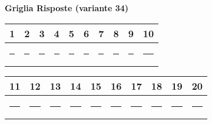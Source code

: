 \documentclass{exam}%
\newcounter{variant}%
\begin{document}
%
\normalsize%
\setcounter{variant}{34}%
\noindent \textbf{  }%
\bigskip%
\noindent\textbf{Griglia Risposte (variante 34)}%
\begin{center}
\begin{tabular}{|c|c|c|c|c|c|c|c|c|c|}
\hline
1 & 2 & 3 & 4 & 5 & 6 & 7 & 8 & 9 & 10 \\ \hline
\rule{1cm}{0pt}\rule[-0.5em]{0pt}{1.5em} & \rule{1cm}{0pt}\rule[-0.5em]{0pt}{1.5em} & \rule{1cm}{0pt}\rule[-0.5em]{0pt}{1.5em} & \rule{1cm}{0pt}\rule[-0.5em]{0pt}{1.5em} & \rule{1cm}{0pt}\rule[-0.5em]{0pt}{1.5em} & \rule{1cm}{0pt}\rule[-0.5em]{0pt}{1.5em} & \rule{1cm}{0pt}\rule[-0.5em]{0pt}{1.5em} & \rule{1cm}{0pt}\rule[-0.5em]{0pt}{1.5em} & \rule{1cm}{0pt}\rule[-0.5em]{0pt}{1.5em} & \rule{1cm}{0pt}\rule[-0.5em]{0pt}{1.5em} \\ \hline
\end{tabular}
\end{center}%
\vspace{0.3em}%
\begin{center}
\begin{tabular}{|c|c|c|c|c|c|c|c|c|c|}
\hline
11 & 12 & 13 & 14 & 15 & 16 & 17 & 18 & 19 & 20 \\ \hline
\rule{1cm}{0pt}\rule[-0.5em]{0pt}{1.5em} & \rule{1cm}{0pt}\rule[-0.5em]{0pt}{1.5em} & \rule{1cm}{0pt}\rule[-0.5em]{0pt}{1.5em} & \rule{1cm}{0pt}\rule[-0.5em]{0pt}{1.5em} & \rule{1cm}{0pt}\rule[-0.5em]{0pt}{1.5em} & \rule{1cm}{0pt}\rule[-0.5em]{0pt}{1.5em} & \rule{1cm}{0pt}\rule[-0.5em]{0pt}{1.5em} & \rule{1cm}{0pt}\rule[-0.5em]{0pt}{1.5em} & \rule{1cm}{0pt}\rule[-0.5em]{0pt}{1.5em} & \rule{1cm}{0pt}\rule[-0.5em]{0pt}{1.5em} \\ \hline
\end{tabular}
\end{center}%
\vspace{1em}%
\end{document}
